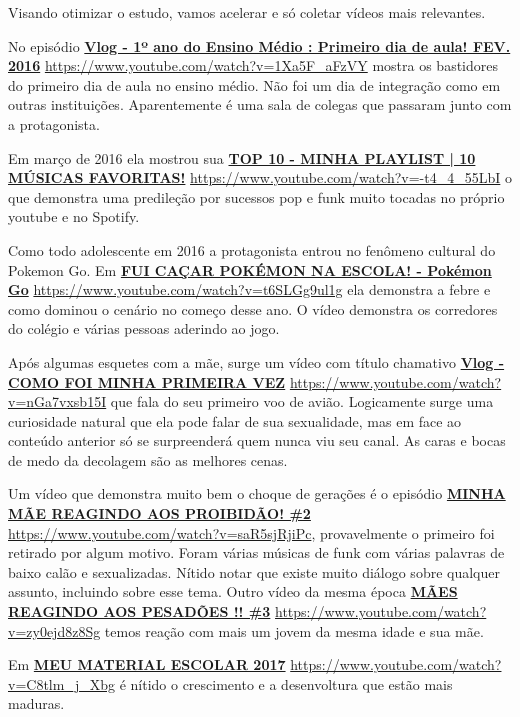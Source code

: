 Visando otimizar o estudo, vamos acelerar e só coletar vídeos mais relevantes.

No episódio \href{https://www.youtube.com/watch?v=1Xa5F_aFzVY}{\textbf{Vlog - 1º ano do Ensino Médio : Primeiro dia de aula! FEV. 2016}} \url{https://www.youtube.com/watch?v=1Xa5F_aFzVY} mostra os bastidores do primeiro dia de aula no ensino médio. Não foi um dia de integração como em outras instituições. Aparentemente é uma sala de colegas que passaram junto com a protagonista.

Em março de 2016 ela mostrou sua \href{https://www.youtube.com/watch?v=-t4_4_55LbI}{\textbf{TOP 10 - MINHA PLAYLIST | 10 MÚSICAS FAVORITAS!}} \url{https://www.youtube.com/watch?v=-t4_4_55LbI} o que demonstra uma predileção por sucessos pop e funk muito tocadas no próprio youtube e no Spotify.

Como todo adolescente em 2016 a protagonista entrou no fenômeno cultural do Pokemon Go. Em \href{https://www.youtube.com/watch?v=t6SLGg9ul1g}{\textbf{FUI CAÇAR POKÉMON NA ESCOLA! - Pokémon Go}} \url{https://www.youtube.com/watch?v=t6SLGg9ul1g} ela demonstra a febre e como dominou o cenário no começo desse ano. O vídeo demonstra os corredores do colégio e várias pessoas aderindo ao jogo.

Após algumas esquetes com a mãe, surge um vídeo com título chamativo \href{https://www.youtube.com/watch?v=nGa7vxsb15I}{\textbf{Vlog - COMO FOI MINHA PRIMEIRA VEZ}} \url{https://www.youtube.com/watch?v=nGa7vxsb15I} que fala do seu primeiro voo de avião. Logicamente surge uma curiosidade natural que ela pode falar de sua sexualidade, mas em face ao conteúdo anterior só se surpreenderá quem nunca viu seu canal. As caras e bocas de medo da decolagem são as melhores cenas.

Um vídeo que demonstra muito bem o choque de gerações é o episódio \href{https://www.youtube.com/watch?v=saR5sjRjiPc}{\textbf{MINHA MÃE REAGINDO AOS PROIBIDÃO! \#2}}
 \url{https://www.youtube.com/watch?v=saR5sjRjiPc}, provavelmente o primeiro foi retirado por algum motivo. Foram várias músicas de funk com várias palavras de baixo calão e sexualizadas. Nítido notar que existe muito diálogo sobre qualquer assunto, incluindo sobre esse tema. Outro vídeo da mesma época \href{https://www.youtube.com/watch?v=zy0ejd8z8Sg}{\textbf{MÃES REAGINDO AOS PESADÕES !! \#3}} \url{https://www.youtube.com/watch?v=zy0ejd8z8Sg} temos reação com mais um jovem da mesma idade e sua mãe.

Em \href{https://www.youtube.com/watch?v=C8tlm_j_Xbg}{\textbf{MEU MATERIAL ESCOLAR 2017}} \url{https://www.youtube.com/watch?v=C8tlm_j_Xbg} é nítido o crescimento e a desenvoltura que estão mais maduras.

